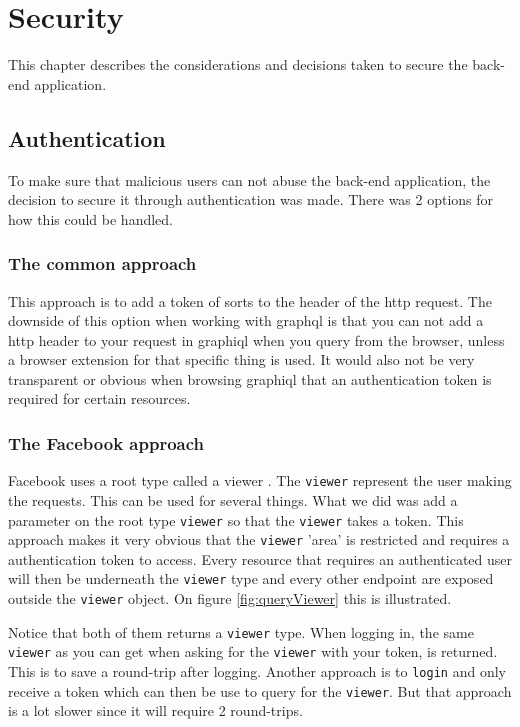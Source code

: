 \chapter{Security}
This chapter describes the considerations and decisions taken to secure the back-end application.

\section{Authentication}
To make sure that malicious users can not abuse the back-end application, the decision to secure it through authentication was made. There was 2 options for how this could be handled. 

\subsection{The common approach}
This approach is to add a token of sorts to the header of the \gls{http} request. The downside of this option when working with \gls{graphql} is that you can not add a \gls{http} header to your request in \gls{graphiql} when you query from the browser, unless a browser extension for that specific thing is used. It would also not be very transparent or obvious when browsing \gls{graphiql} that an authentication token is required for certain resources.

\subsection{The Facebook approach}
Facebook uses a root type called a viewer \citep{facebook:viewer}. The \verb+viewer+ represent the user making the requests. This can be used for several things. What we did was add a parameter on the root type \verb+viewer+ so that the \verb+viewer+ takes a token. This approach makes it very obvious that the \verb+viewer+ 'area' is restricted and requires a authentication token to access. Every resource that requires an authenticated user will then be underneath the \verb+viewer+ type and every other endpoint are exposed outside the \verb+viewer+ object. On figure \ref{fig:queryViewer} this is illustrated.


Notice that both of them returns a \verb+viewer+ type. When logging in, the same \verb+viewer+ as you can get when asking for the \verb+viewer+ with your token, is returned. This is to save a round-trip after logging. Another approach is to \verb+login+ and only receive a token which can then be use to query for the \verb+viewer+. But that approach is a lot slower since it will require 2 round-trips.

